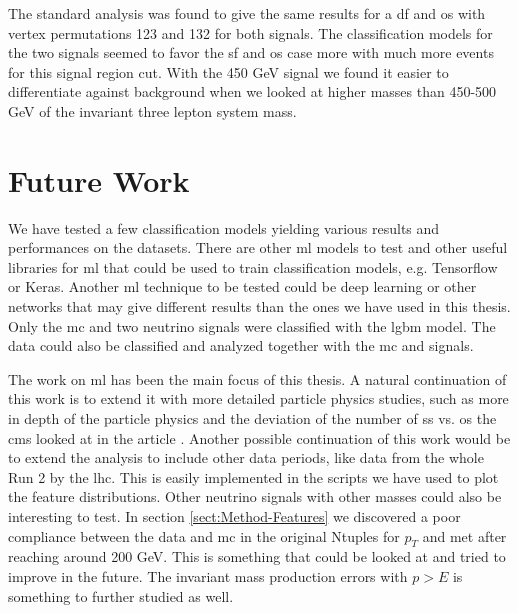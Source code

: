 \documentclass[a4paper, american, 12pt]{report}
\begin{document}
	The standard analysis was found to give the same results for a \acrshort{df} and \acrshort{os} with vertex permutations 123 and 132 for both signals. The classification models for the two signals seemed to favor the \acrshort{sf} and \acrshort{os} case more with much more events for this signal region cut. With the 450 GeV signal we found it easier to differentiate against background when we looked at higher masses than 450-500 GeV of the invariant three lepton system mass.

	
	\section{Future Work}
	\label{sect:Conclusion-Future}
	We have tested a few classification models yielding various results and performances on the datasets. There are other \acrshort{ml} models to test and other useful libraries for \acrshort{ml} that could be used to train classification models, e.g. Tensorflow or Keras. Another \acrshort{ml} technique to be tested could be deep learning or other networks that may give different results than the ones we have used in this thesis. Only the \acrshort{mc} and two neutrino signals were classified with the \acrshort{lgbm} model. The data could also be classified and analyzed together with the \acrshort{mc} and signals.
	
	The work on \acrshort{ml} has been the main focus of this thesis. A natural continuation of this work is to extend it with more detailed particle physics studies, such as more in depth of the particle physics and the deviation of the number of \acrshort{ss} vs. \acrshort{os} the \acrshort{cms} looked at in the article \cite{mymodel2}. Another possible continuation of this work would be to extend the analysis to include other data periods, like data from the whole Run 2 by the \acrshort{lhc}. This is easily implemented in the scripts we have used to plot the feature distributions. Other neutrino signals with other masses could also be interesting to test. In section \ref{sect:Method-Features} we discovered a poor compliance between the data and \acrshort{mc} in the original Ntuples for $p_T$ and \acrshort{met} after reaching around 200 GeV. This is something that could be looked at and tried to improve in the future. The invariant mass production errors with $p>E$ is something to further studied as well.

	
\end{document}
